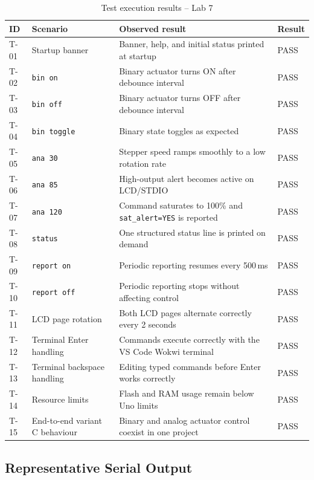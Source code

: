 \documentclass[12pt]{article}
\begin{document}
\begin{table}[H]
\centering
\small
\begin{tabular}{p{0.8cm} p{3.3cm} p{6.0cm} p{1.3cm}}
\toprule
\textbf{ID} & \textbf{Scenario} & \textbf{Observed result} & \textbf{Result} \\
\midrule
T-01 & Startup banner & Banner, help, and initial status printed at startup & PASS \\
T-02 & \texttt{bin on} & Binary actuator turns ON after debounce interval & PASS \\
T-03 & \texttt{bin off} & Binary actuator turns OFF after debounce interval & PASS \\
T-04 & \texttt{bin toggle} & Binary state toggles as expected & PASS \\
T-05 & \texttt{ana 30} & Stepper speed ramps smoothly to a low rotation rate & PASS \\
T-06 & \texttt{ana 85} & High-output alert becomes active on LCD/STDIO & PASS \\
T-07 & \texttt{ana 120} & Command saturates to 100\% and \texttt{sat\_alert=YES} is reported & PASS \\
T-08 & \texttt{status} & One structured status line is printed on demand & PASS \\
T-09 & \texttt{report on} & Periodic reporting resumes every 500\,ms & PASS \\
T-10 & \texttt{report off} & Periodic reporting stops without affecting control & PASS \\
T-11 & LCD page rotation & Both LCD pages alternate correctly every 2 seconds & PASS \\
T-12 & Terminal Enter handling & Commands execute correctly with the VS Code Wokwi terminal & PASS \\
T-13 & Terminal backspace handling & Editing typed commands before Enter works correctly & PASS \\
T-14 & Resource limits & Flash and RAM usage remain below Uno limits & PASS \\
T-15 & End-to-end variant C behaviour & Binary and analog actuator control coexist in one project & PASS \\
\bottomrule
\end{tabular}
\caption{Test execution results -- Lab 7}
\label{tab:testresults}
\end{table}

\subsection{Representative Serial Output}
\end{document}
